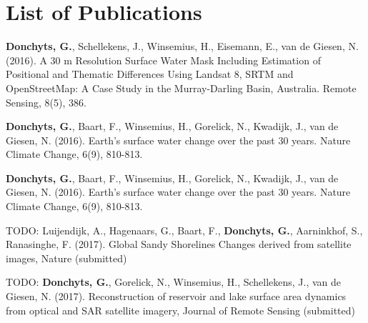 \chapter*{List of Publications}
\label{publications}

\begin{etaremune}{\small

\item \textbf{Donchyts, G.}, Schellekens, J., Winsemius, H., Eisemann, E., van de Giesen, N. (2016). A 30 m Resolution Surface Water Mask Including Estimation of Positional and Thematic Differences Using Landsat 8, SRTM and OpenStreetMap: A Case Study in the Murray-Darling Basin, Australia. Remote Sensing, 8(5), 386.

\item \textbf{Donchyts, G.}, Baart, F., Winsemius, H., Gorelick, N., Kwadijk, J., van de Giesen, N. (2016). Earth's surface water change over the past 30 years. Nature Climate Change, 6(9), 810-813.

\item \textbf{Donchyts, G.}, Baart, F., Winsemius, H., Gorelick, N., Kwadijk, J., van de Giesen, N. (2016). Earth's surface water change over the past 30 years. Nature Climate Change, 6(9), 810-813.

\item TODO: Luijendijk, A., Hagenaars, G., Baart, F., \textbf{Donchyts, G.}, Aarninkhof, S., Ranasinghe, F. (2017). Global Sandy Shorelines Changes derived from satellite images, Nature (submitted)

\item TODO: \textbf{Donchyts, G.}, Gorelick, N., Winsemius, H., Schellekens, J., van de Giesen, N. (2017). Reconstruction of reservoir and lake surface area dynamics from optical and SAR satellite imagery, Journal of Remote Sensing (submitted)

}\end{etaremune}


